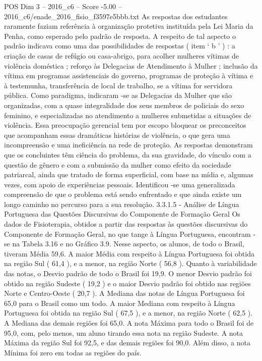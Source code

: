 \begin{textsample}{POS Dim 3 – 2016\_c6 – Score -5.00 – 2016\_c6/enade\_2016\_fisio\_f3597e5bbb.txt}
As respostas dos estudantes raramente faziam referência à organização protetiva instituída pela Lei Maria da Penha, como esperado pelo padrão de resposta.
A respeito de tal aspecto o padrão indicava como uma das possibilidades de respostas ( item ‘ b ’ ) : a criação de casas de refúgio ou casa-abrigo, para acolher mulheres vítimas de violência doméstica ; reforço às Delegacias de Atendimento à Mulher ; inclusão da vítima em programas assistenciais do governo, programas de proteção à vítima e à testemunha, transferência de local de trabalho, se a vítima for servidora pública.
Como paradigma, indicaram -se as Delegacias da Mulher que são organizadas, com a quase integralidade dos seus membros de policiais do sexo feminino, e especializadas no atendimento a mulheres submetidas a situações de violência.
Essa preocupação gerencial tem por escopo bloquear os preconceitos que acompanham essas dramáticas histórias de violência, o que gera uma incompreensão e uma ineficiência na rede de proteção.
As respostas demonstram que os concluintes têm ciência do problema, da sua gravidade, do vínculo com a questão de gênero e com a submissão da mulher como efeito da sociedade patriarcal, ainda que tratado de forma superficial, com base na mídia e, algumas vezes, com apoio de experiências pessoais.
Identificou -se uma generalizada compreensão de que o problema está sendo enfrentado e que ainda existe um longo caminho no percurso para a sua resolução. 3.3.1.5 - Análise de Língua Portuguesa das Questões Discursivas do Componente de Formação Geral Os dados de Fisioterapia, obtidos a partir das respostas às questões discursivas do Componente de Formação Geral, no que tange à Língua Portuguesa, encontram -se na Tabela 3.16 e no Gráfico 3.9.
Nesse aspecto, os alunos, de todo o Brasil, tiveram Média 59,6.
A maior Média com respeito à Língua Portuguesa foi obtida na região Sul ( 61,4 ), e a menor, na região Norte ( 56,8 ).
Quanto à variabilidade das notas, o Desvio padrão de todo o Brasil foi 19,9.
O menor Desvio padrão foi obtido na região Sudeste ( 19,2 ) e o maior Desvio padrão foi obtido nas regiões Norte e Centro-Oeste ( 20,7 ).
A Mediana das notas de Língua Portuguesa foi 65,0 para o Brasil como um todo.
A maior Mediana com respeito à Língua Portuguesa foi obtida na região Sul ( 67,5 ), e a menor, na região Norte ( 62,5 ).
A Mediana das demais regiões foi 65,0.
A nota Máxima para todo o Brasil foi de 95,0, com, pelo menos, um aluno tirando essa nota na região Sudeste.
A nota Máxima da região Sul foi 92,5, e das demais regiões foi 90,0.
Além disso, a nota Mínima foi zero em todas as regiões do país.

\end{textsample}

